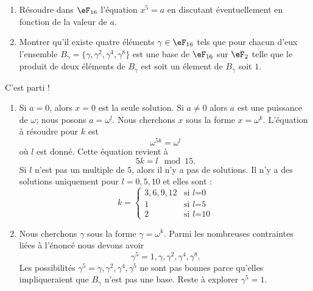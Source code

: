 \begin{example}
    \begin{enumerate}
        \item
            Résoudre dans \( \eF_{16}\) l'équation \( x^5=a\) en discutant éventuellement en fonction de la valeur de \( a\).
        \item
            Montrer qu'il existe quatre éléments \( \gamma\in\eF_{16}\) tels que pour chacun d'eux l'ensemble \( B_{\gamma}=\{ \gamma,\gamma^2,\gamma^4,\gamma^8 \}\) est une base de \( \eF_{16}\) sur \( \eF_2\) telle que le produit de deux éléments de \( B_{\gamma}\) est soit un élement de \( B_{\gamma}\) soit \( 1\).
    \end{enumerate}

    C'est parti !

    \begin{enumerate}
        \item
            Si \( a=0\), alors \( x=0\) est la seule solution. Si \( a\neq 0 \) alors \( a\) est une puissance de \( \omega\); nous posons \( a=\omega^l\). Nous cherchons \( x\) sous la forme \( x=\omega^k\). L'équation à résoudre pour \( k\) est
            \begin{equation}
                \omega^{5k}=\omega^l
            \end{equation}
            où \( l\) est donné. Cette équation revient à
            \begin{equation}
                5k=l\mod 15.
            \end{equation}
            Si \( l\) n'est pas un multiple de \( 5\), alors il n'y a pas de solutions. Il n'y a des solutions uniquement pour \( l=0,5,10\) et elles sont :
            \begin{equation}
                k=\begin{cases}
                    3,6,9,12     &   \text{si } l\text{=0}\\
                    1     &   \text{si } l\text{=5}\\
                    2     &   \text{si } l\text{=10}
                \end{cases}
            \end{equation}
        \item
            Nous cherchons \( \gamma\) sous la forme \( \gamma=\omega^k\). Parmi les nombreuses contraintes liées à l'énoncé nous devons avoir
            \begin{equation}
                \gamma^5=1,\gamma,\gamma^2,\gamma^4,\gamma^8.
            \end{equation}
            Les possibilités \( \gamma^5=\gamma,\gamma^2,\gamma^4,\gamma^5\) ne sont pas bonnes parce qu'elles impliqueraient que \( B_{\gamma}\) n'est pas une base. Reste à explorer \( \gamma^5=1\).


\end{enumerate}
\end{example}
